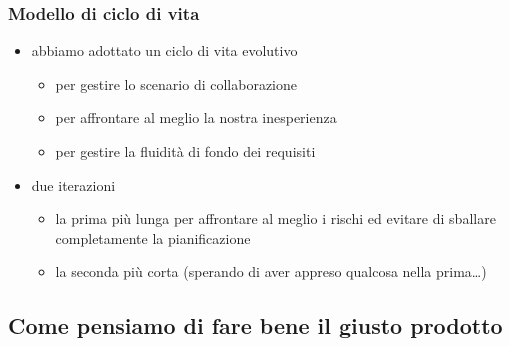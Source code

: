 \begin{frame}
\frametitle{Modello di ciclo di vita}

\begin{itemize}
\item abbiamo adottato un \alert{ciclo di vita evolutivo}
\begin{itemize}
\item per gestire lo scenario di collaborazione
\item per affrontare al meglio la nostra inesperienza
\item per gestire la fluidità di fondo dei requisiti
\end{itemize}

\item due iterazioni
\begin{itemize}
\item la prima più lunga per affrontare al meglio i rischi ed evitare di sballare completamente la pianificazione
\item la seconda più corta (sperando di aver appreso qualcosa nella prima\ldots)
\end{itemize}

\end{itemize}

\end{frame}





\subsection{Come pensiamo di fare bene il giusto prodotto}

